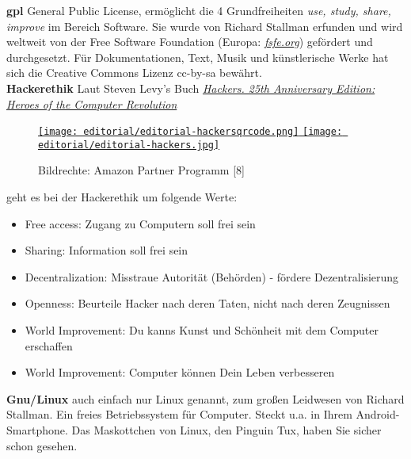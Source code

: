 \documentclass[10pt,a4paper,ngerman,twoside]{article} %
\begin{document}
\textbf{gpl} General Public License, ermöglicht die 4 Grundfreiheiten \emph{use, study, share, improve} im Bereich Software. Sie wurde von Richard Stallman erfunden und wird weltweit von der Free Software Foundation (Europa: \href{http://fsfe.org/}{\textit{fsfe.org}}) gefördert und durchgesetzt. Für Dokumentationen, Text, Musik und künstlerische Werke hat sich die Creative Commons Lizenz cc-by-sa bewährt. \\

\textbf{Hackerethik} Laut Steven Levy's Buch \href{http://www.amazon.de/gp/product/1449388396/ref=as_li_ss_tl?ie=UTF8&camp=1638&creative=19454&creativeASIN=1449388396&linkCode=as2&tag=spielendprogr-21}{\textit{Hackers. 25th Anniversary Edition: Heroes of the Computer Revolution}}\\ 
\begin{figure}
\href{http://www.amazon.de/gp/product/1449388396/ref=as_li_ss_tl?ie=UTF8&camp=1638&creative=19454&creativeASIN=1449388396&linkCode=as2&tag=spielendprogr-21}{
\texttt{[image: editorial/editorial-hackersqrcode.png]} 
\texttt{[image: editorial/editorial-hackers.jpg]}}\\
\caption{Bildrechte: Amazon Partner Programm [8]}
\end{figure}
geht es bei der Hackerethik um folgende Werte:
\begin{itemize}
\item Free access: Zugang zu Computern soll frei sein
\item Sharing: Information soll frei sein
\item Decentralization: Misstraue Autorität (Behörden) - fördere Dezentralisierung
\item Openness: Beurteile Hacker nach deren Taten, nicht nach deren Zeugnissen
\item World Improvement: Du kanns Kunst und Schönheit mit dem Computer erschaffen
\item World Improvement: Computer können Dein Leben verbesseren
\end{itemize}

\textbf{Gnu/Linux} auch einfach nur Linux genannt, zum großen Leidwesen von Richard Stallman. Ein freies Betriebssystem für Computer. Steckt u.a. in Ihrem Android-Smartphone. Das Maskottchen von Linux, den Pinguin Tux, haben Sie sicher schon gesehen. \\
\end{document}
